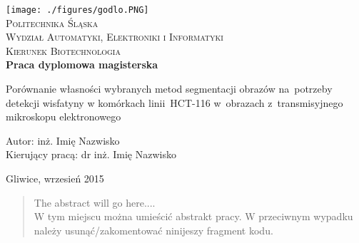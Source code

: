 
\newpage
\thispagestyle{empty}





\begin{onehalfspacing}
\begin{center}

\centering
\texttt{[image: ./figures/godlo.PNG]} \\[.8cm]


{\fontsize{17}{17}\selectfont
\textsc{Politechnika Śląska \\[.3cm]
Wydział Automatyki, Elektroniki i Informatyki  \\[.3cm]
Kierunek Biotechnologia  \\[2.5cm]}
\textbf{Praca dyplomowa magisterska \\[1.7cm]}}



\large 
{Porównanie własności wybranych metod segmentacji obrazów na~potrzeby detekcji wisfatyny w komórkach linii~HCT-116 w~obrazach z~transmisyjnego mikroskopu elektronowego} \\[2.3cm]


\large
\begin{flushleft}
Autor: inż. Imię Nazwisko  \\
Kierujący pracą:  dr inż. Imię Nazwisko \\
\end{flushleft}

\vspace{3cm}
Gliwice, wrzesień 2015
\end{center}
\end{onehalfspacing}

\singlespacing
\newpage
\thispagestyle{empty}
\mbox{}


\begin{abstract}
The abstract will go here.... \\
W tym miejscu można umieścić abstrakt pracy. W przeciwnym wypadku należy usunąć/zakomentować ninijeszy fragment kodu.
\end{abstract}


\doublespacing
\newpage
\thispagestyle{empty}
\mbox{}

\setcounter{page}{0} \pagestyle{plain}


\tableofcontents

\listoffigures
\listoftables



\pagestyle{fancy}